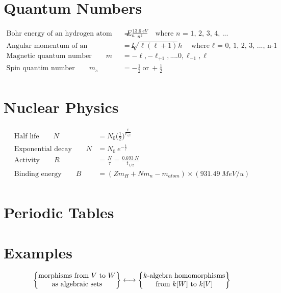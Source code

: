 \documentclass[]{article}
\begin{document}

\newpage


\section{Quantum Numbers}

\begin{align*}
	\text{Bohr energy of an hydrogen atom} \qquad E_n &= \frac{13.6 \ eV}{n^2} \quad \text{where $n$ = 1, 2, 3, 4, ...} \\
	\text{Angular momentum of an electron's orbit} \qquad L &= \sqrt{\ell(\ell+1)}\hbar \quad \text{where $\ell$ = 0, 1, 2, 3, ..., n-1} \\
	\text{Magnetic quantum number} \qquad m &= -\ell, -\ell_{+1}, ....0, \ell_{-1}, \ell \\
	\text{Spin quantim number} \qquad m_s &= -\frac{1}{2} \ \text{or} \  +\frac{1}{2} \\
\end{align*}


\newpage


\section{Nuclear Physics}

\begin{align*}
	\text{Half life} \qquad N &= N_0 {\Big( \frac{1}{2} \Big)}^{\frac{t}{t_{1/2}}} \\
	\text{Exponential decay} \qquad N &= N_0 \ e^{-\frac{t}{\tau}} \\
	\text{Activity} \qquad R &= \frac{N}{\tau} = \frac{0.693 \ N}{t_{1/2}} \\
	\text{Binding energy} \qquad B &= ( Z m_H + N m_n - m_{atom} ) \times (931.49 \ M eV/u) \\
\end{align*}

\newpage


\section{Periodic Tables}

\newpage

\section{Examples}

\[
\left\{
\begin{tabular}{@{}c@{}}
	morphisms~from~$V$~to~$W$\\
	as~algebraic~sets
\end{tabular}
\right\}
\longleftrightarrow
\left\{
\begin{tabular}{@{}c@{}}
	$k$-algebra homomorphisms\\
	from $k[W]$ to $k[V]$
\end{tabular}
\right\}
\]

\showthe\footskip
\end{document}
